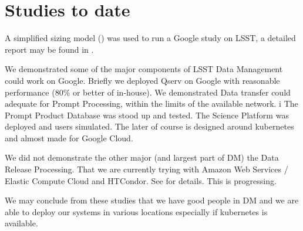 \section{Studies to date}
A simplified sizing model () was used to run a Google study on \gls{LSST}, a detailed
report may be found in .

We demonstrated some of the major components of \gls{LSST} \gls{Data Management} could work on Google.
Briefly we deployed \gls{Qserv} on Google with reasonable performance (80\% or better of in-house).
We demonstrated Data transfer  could adequate for \gls{Prompt Processing}, within the limits of the available network. i
The Prompt Product Database was  stood up and tested.  The  \gls{Science Platform} was deployed and users simulated.
The later of course is designed around kubernetes and almost made for Google Cloud.


We did not demonstrate the other major (and largest part of \gls{DM}) the \gls{Data Release} Processing. That we are
currently trying with
Amazon Web Services / Elastic Compute Cloud and HTCondor.
See  for details.
This is progressing.

We may conclude from these studies that we have good people in \gls{DM} and
we are able to deploy our systems in various locations especially if kubernetes is available.
